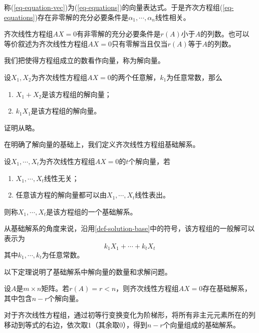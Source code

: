 称(\ref{eq-equation-vec})为(\ref{eq-equations})的向量表达式。于是齐次方程组(\ref{eq-equations})存在非零解的充分必要条件是$\alpha_1,\cdots,\alpha_n$线性相关。

\begin{thm}
    \label{thm-equation-nonzero-solve}
    齐次线性方程组$AX=0$有非零解的充分必要条件是$r(A)$小于$A$的列数。也可以等价叙述为齐次线性方程组$AX=0$只有零解当且仅当$r(A)$等于$A$的列数。
\end{thm}

我们把使得方程组成立的数看作向量，称为解向量。

\begin{property}
    \label{property-solution-vector}
    设$X_1,X_2$为齐次线性方程组$AX=0$的两个任意解，$k_1$为任意常数，那么
    \begin{enumerate}
        \item $X_1+X_2$是该方程组的解向量；
        \item $k_1X_1$是该方程组的解向量。
    \end{enumerate}
\end{property}

证明从略。

在明确了解向量的基础上，我们定义齐次线性方程组基础解系。

\begin{definition}
    \label{def-solution-base}
    设$X_1,\cdots,X_t$为齐次线性方程组$AX=0$的$t$个解向量，若
    \begin{enumerate}
        \item $X_1,\cdots,X_t$线性无关；
        \item 任意该方程的解向量都可以由$X_1,\cdots,X_t$线性表出。
    \end{enumerate}
    则称$X_1,\cdots,X_t$是该方程组的一个基础解系。
\end{definition}

从基础解系的角度来说，沿用\ref{def-solution-base}中的符号，该方程组的一般解可以表示为
\[
    k_1X_1+\cdots+k_tX_t
\]
其中$k_1,\cdots,k_t$为任意常数。

以下定理说明了基础解系中解向量的数量和求解问题。

\begin{thm}
    \label{thm-solution-base-calculation}
    设$A$是$m\times n$矩阵。若$r(A)=r<n$，则齐次线性方程组$AX=0$存在基础解系，其中包含$n-r$个解向量。
\end{thm}

对于齐次线性方程组，通过初等行变换变化为阶梯形，将所有非主元元素所在的列移动到等式的右边，依次取$1$（其余取$0$），得到$n-r$个向量组成的基础解系。

